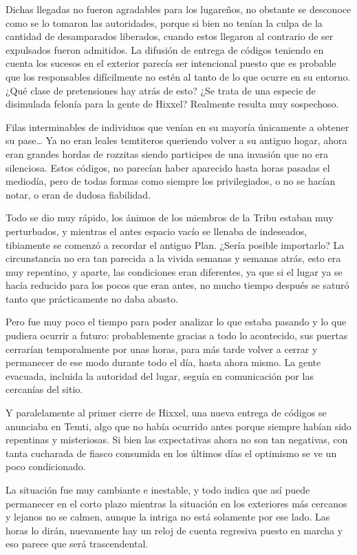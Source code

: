 \documentclass[
  spanish,
]{book}
\begin{document}
Dichas llegadas no fueron agradables para los lugareños, no obstante se desconoce como se lo tomaron las autoridades, porque si bien no tenían la culpa de la cantidad de desamparados liberados, cuando estos llegaron al contrario de ser expulsados fueron admitidos. La difusión de entrega de códigos teniendo en cuenta los sucesos en el exterior parecía ser intencional puesto que es probable que los responsables difícilmente no estén al tanto de lo que ocurre en su entorno. ¿Qué clase de pretensiones hay atrás de esto? ¿Se trata de una especie de disimulada felonía para la gente de Hixxel? Realmente resulta muy sospechoso.

Filas interminables de individuos que venían en su mayoría únicamente a obtener su pase\ldots{} Ya no eran leales temtiteros queriendo volver a su antiguo hogar, ahora eran grandes hordas de rozzitas siendo participes de una invasión que no era silenciosa. Estos códigos, no parecían haber aparecido hasta horas pasadas el mediodía, pero de todas formas como siempre los privilegiados, o no se hacían notar, o eran de dudosa fiabilidad.

Todo se dio muy rápido, los ánimos de los miembros de la Tribu estaban muy perturbados, y mientras el antes espacio vacío se llenaba de indeseados, tibiamente se comenzó a recordar el antiguo Plan. ¿Sería posible importarlo? La circunstancia no era tan parecida a la vivida semanas y semanas atrás, esto era muy repentino, y aparte, las condiciones eran diferentes, ya que si el lugar ya se hacía reducido para los pocos que eran antes, no mucho tiempo después se saturó tanto que prácticamente no daba abasto.

Pero fue muy poco el tiempo para poder analizar lo que estaba pasando y lo que pudiera ocurrir a futuro: probablemente gracias a todo lo acontecido, sus puertas cerrarían temporalmente por unas horas, para más tarde volver a cerrar y permanecer de ese modo durante todo el día, hasta ahora mismo. La gente evacuada, incluida la autoridad del lugar, seguía en comunicación por las cercanías del sitio.

Y paralelamente al primer cierre de Hixxel, una nueva entrega de códigos se anunciaba en Temti, algo que no había ocurrido antes porque siempre habían sido repentinas y misteriosas. Si bien las expectativas ahora no son tan negativas, con tanta cucharada de fiasco consumida en los últimos días el optimismo se ve un poco condicionado.

La situación fue muy cambiante e inestable, y todo indica que así puede permanecer en el corto plazo mientras la situación en los exteriores más cercanos y lejanos no se calmen, aunque la intriga no está solamente por ese lado. Las horas lo dirán, nuevamente hay un reloj de cuenta regresiva puesto en marcha y eso parece que será trascendental.
\end{document}
